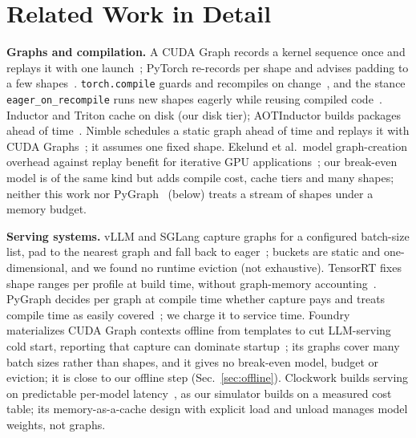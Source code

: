 \documentclass[conference]{IEEEtran}
\begin{document}
\section{Related Work in Detail}\label{sec:related}
\textbf{Graphs and compilation.} A CUDA Graph records a kernel sequence once and replays it with one launch~\cite{gray2019}; PyTorch re-records per shape and advises padding to a few shapes~\cite{pt_cgtrees}. \texttt{torch.compile} guards and recompiles on change~\cite{ansel2024}, and the stance \texttt{eager\_on\_recompile} runs new shapes eagerly while reusing compiled code~\cite{pt_stance}. Inductor and Triton cache on disk (our disk tier); AOTInductor builds packages ahead of time~\cite{pt_aoti}. Nimble schedules a static graph ahead of time and replays it with CUDA Graphs~\cite{nimble}; it assumes one fixed shape. Ekelund et al.\ model graph-creation overhead against replay benefit for iterative GPU applications~\cite{ekelund2025}; our break-even model is of the same kind but adds compile cost, cache tiers and many shapes; neither this work nor PyGraph~\cite{pygraph} (below) treats a stream of shapes under a memory budget.

\textbf{Serving systems.} vLLM and SGLang capture graphs for a configured batch-size list, pad to the nearest graph and fall back to eager~\cite{vllm_cg,sglang_args}; buckets are static and one-dimensional, and we found no runtime eviction (not exhaustive). TensorRT fixes shape ranges per profile at build time, without graph-memory accounting~\cite{trt_dyn}. PyGraph decides per graph at compile time whether capture pays and treats compile time as easily covered~\cite{pygraph}; we charge it to service time. Foundry materializes CUDA Graph contexts offline from templates to cut LLM-serving cold start, reporting that capture can dominate startup~\cite{foundry}; its graphs cover many batch sizes rather than shapes, and it gives no break-even model, budget or eviction; it is close to our offline step (Sec.~\ref{sec:offline}). Clockwork builds serving on predictable per-model latency~\cite{clockwork}, as our simulator builds on a measured cost table; its memory-as-a-cache design with explicit load and unload manages model weights, not graphs.
\end{document}
